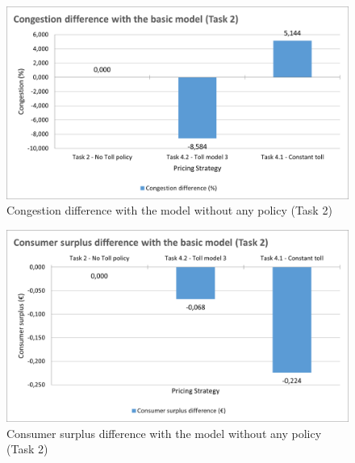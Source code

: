 \documentclass[a4paper, 12pt,oneside]{article}
\begin{document}
\begin{minipage}[c]{0.5\textwidth}
\begin{figure}[H]
    \centering
    \includegraphics[width=1\textwidth]{Images/Step4/Congestion.png}
    \caption{Congestion difference with the model without any policy (Task 2)}
    \label{fig:Congestion difference with the model without any policy (Task 2)}
\end{figure}
\end{minipage}
\begin{minipage}[c]{0.5\textwidth}
\begin{figure}[H]
    \centering
    \includegraphics[width=1\textwidth]{Images/Step4/Surplus.png}
    \caption{Consumer surplus difference with the model without any policy (Task 2)}
    \label{fig:Consumer surplus difference with the model without any policy (Task 2)}
\end{figure}
\end{minipage}
\end{document}
